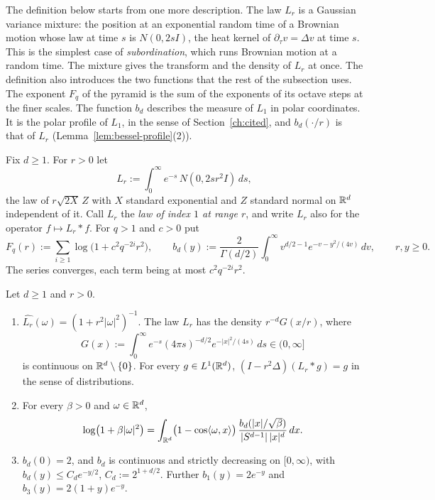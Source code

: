 The definition below starts from one more description. The law $L_r$ is a Gaussian variance
mixture: the position at an exponential random time of a Brownian motion whose law at time $s$ is
$N(0, 2sI)$, the heat kernel of $\partial_\tau v = \Delta v$ at time $s$. This is the simplest case of
\emph{subordination}, which runs Brownian motion at a random time. The mixture gives the transform
and the density of $L_r$ at once. The definition also introduces the two functions that the rest of
the subsection uses. The exponent $F_q$ of the \Matern{} pyramid is the sum of the exponents of its
octave steps at the finer scales. The function $b_d$ describes the \Levy{} measure of $L_1$ in polar
coordinates. It is the polar profile of $L_1$, in the sense of Section~\ref{ch:cited}, and
$b_d(\cdot/r)$ is that of $L_r$ (Lemma~\ref{lem:bessel-profile}(2)).

\begin{definition}
\label{def:matern-pyramid-data}

Fix $d \ge 1$. For $r > 0$ let
\[
  L_r := \int_0^\infty e^{-s}\,N(0, 2sr^2I)\,ds ,
\]
the law of $r\sqrt{2X}\,Z$ with $X$ standard exponential and $Z$ standard normal on $\mathbb{R}^d$
independent of it. Call $L_r$ the \emph{\Matern{} law of index $1$ at range $r$}, and write $L_r$
also for the operator $f \mapsto L_r * f$. For $q > 1$ and $c > 0$ put
\[
  F_q(r) := \sum_{i \ge 1}\log\bigl(1 + c^2q^{-2i}r^2\bigr), \qquad
  b_d(y) := \frac{2}{\Gamma(d/2)}\int_0^\infty v^{d/2-1}e^{-v-y^2/(4v)}\,dv ,
  \qquad r, y \ge 0 .
\]
The series converges, each term being at most $c^2q^{-2i}r^2$.
\end{definition}

\begin{lemma}
\label{lem:bessel-profile}

Let $d \ge 1$ and $r > 0$.
\begin{enumerate}
\item $\widehat{L_r}(\omega) = (1 + r^2|\omega|^2)^{-1}$. The law $L_r$ has the density
$r^{-d}G(x/r)$, where
\[
  G(x) := \int_0^\infty e^{-s}(4\pi s)^{-d/2}e^{-|x|^2/(4s)}\,ds \in (0, \infty]
\]
is continuous on $\mathbb{R}^d \setminus \{0\}$. For every $g \in L^1(\mathbb{R}^d)$,
$(I - r^2\Delta)(L_r * g) = g$ in the sense of distributions.
\item For every $\beta > 0$ and $\omega \in \mathbb{R}^d$,
\[
  \log\bigl(1 + \beta|\omega|^2\bigr)
   = \int_{\mathbb{R}^d}\bigl(1 - \cos\langle\omega, x\rangle\bigr)\,
     \frac{b_d(|x|/\sqrt\beta)}{|S^{d-1}|\,|x|^d}\,dx .
\]
\item $b_d(0) = 2$, and $b_d$ is continuous and strictly decreasing on $[0, \infty)$, with
$b_d(y) \le C_de^{-y/2}$, $C_d := 2^{1+d/2}$. Further $b_1(y) = 2e^{-y}$ and
$b_3(y) = 2(1 + y)e^{-y}$.
\end{enumerate}
\end{lemma}

